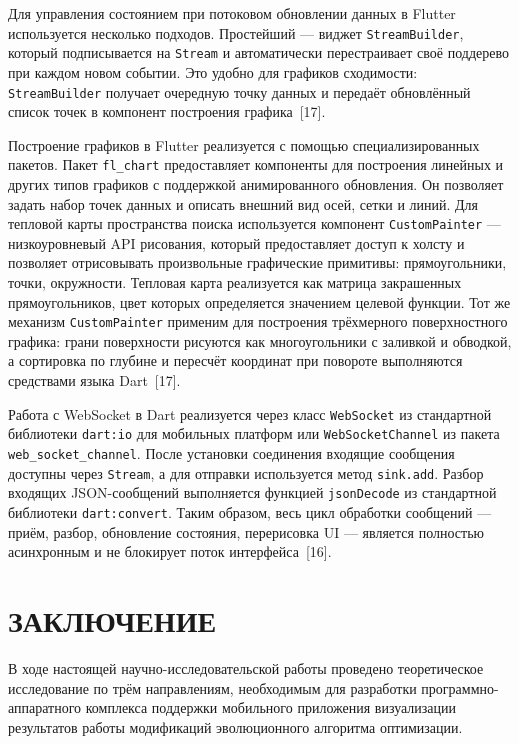 \documentclass[14pt, russian]{scrartcl}
\newcommand{\anonsection}[1]{\cleardoublepage
\phantomsection
\addcontentsline{toc}{section}{\protect\numberline{}#1}
\section*{#1}\vspace*{2.5ex}
}
\begin{document}
Для управления состоянием при потоковом обновлении данных в Flutter
используется несколько подходов. Простейший --- виджет
\texttt{StreamBuilder}, который подписывается на \texttt{Stream} и
автоматически перестраивает своё поддерево при каждом новом событии.
Это удобно для графиков сходимости: \texttt{StreamBuilder} получает
очередную точку данных и передаёт обновлённый список точек в компонент
построения графика~[17].

Построение графиков в Flutter реализуется с помощью специализированных
пакетов. Пакет \texttt{fl\_chart} предоставляет компоненты для построения
линейных и других типов графиков с поддержкой анимированного обновления.
Он позволяет задать набор точек данных и описать внешний вид осей,
сетки и линий. Для тепловой карты пространства поиска используется
компонент \texttt{CustomPainter} --- низкоуровневый API рисования,
который предоставляет доступ к холсту и позволяет отрисовывать
произвольные графические примитивы: прямоугольники, точки, окружности.
Тепловая карта реализуется как матрица закрашенных прямоугольников,
цвет которых определяется значением целевой функции. Тот же механизм
\texttt{CustomPainter} применим для построения трёхмерного поверхностного
графика: грани поверхности рисуются как многоугольники
с заливкой и обводкой, а сортировка по глубине и пересчёт координат
при повороте выполняются средствами языка Dart~[17].

Работа с WebSocket в Dart реализуется через класс \texttt{WebSocket}
из стандартной библиотеки \texttt{dart:io} для мобильных платформ
или \texttt{WebSocketChannel} из пакета \texttt{web\_socket\_channel}.
После установки соединения входящие сообщения доступны через
\texttt{Stream}, а для отправки используется метод \texttt{sink.add}.
Разбор входящих JSON-сообщений выполняется функцией
\texttt{jsonDecode} из стандартной библиотеки \texttt{dart:convert}.
Таким образом, весь цикл обработки сообщений --- приём, разбор,
обновление состояния, перерисовка UI --- является полностью
асинхронным и не блокирует поток интерфейса~[16].


\anonsection{ЗАКЛЮЧЕНИЕ}

В ходе настоящей научно-исследовательской работы проведено теоретическое
исследование по трём направлениям, необходимым для разработки
программно-аппаратного комплекса поддержки мобильного приложения
визуализации результатов работы модификаций эволюционного алгоритма
оптимизации.
\end{document}
